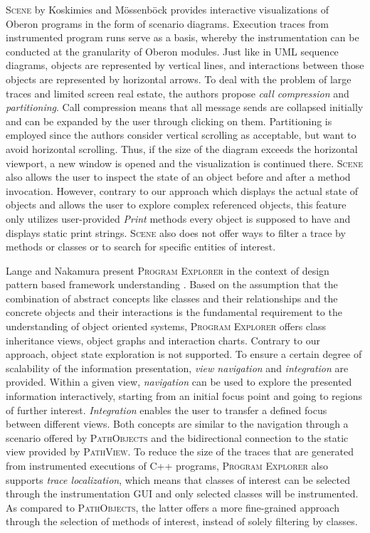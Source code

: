 \textsc{Scene} by Koskimies and Mössenböck \cite{koskimies_scene:_1996} provides interactive visualizations of Oberon programs in the form of scenario diagrams.
Execution traces from instrumented program runs serve as a basis, whereby the instrumentation can be conducted at the granularity of Oberon modules.
Just like in UML sequence diagrams, objects are represented by vertical lines, and interactions between those objects are represented by horizontal arrows.
To deal with the problem of large traces and limited screen  real estate, the authors propose \emph{call compression} and \emph{partitioning}.
Call compression means that all message sends are collapsed initially and can be expanded by the user through clicking on them.
Partitioning is employed since the authors consider vertical scrolling as acceptable, but want to avoid horizontal scrolling. Thus, if the size of the diagram exceeds the horizontal viewport, a new window is opened and the visualization is continued there.
\textsc{Scene} also allows the user to inspect the state of an object before and after a method invocation.
However, contrary to our approach which displays the actual state of objects and allows the user to explore complex referenced objects, this feature only utilizes user-provided \emph{Print} methods every object is supposed to have and displays static print strings.
\textsc{Scene} also does not offer ways to filter a trace by methods or classes or to search for specific entities of interest.

Lange and Nakamura present \textsc{Program Explorer} in the context of design pattern based framework understanding \cite{lange_interactive_1995, lange_program_1995, lange_object-oriented_1997}.
Based on the assumption that the combination of abstract concepts like classes and their relationships and the concrete objects and their interactions is the fundamental requirement to the understanding of object oriented systems, \textsc{Program Explorer} offers class inheritance views, object graphs and interaction charts.
Contrary to our approach, object state exploration is not supported.
To ensure a certain degree of scalability of the information presentation, \emph{view navigation} and \emph{integration} are provided.
Within a given view, \emph{navigation} can be used to explore the presented information interactively, starting from an initial focus point and going to regions of further interest.
\emph{Integration} enables the user to transfer a defined focus between different views.
Both concepts are similar to the navigation through a scenario offered by \textsc{PathObjects} and the bidirectional connection to the static view provided by \textsc{PathView}.
To reduce the size of the traces that are generated from instrumented executions of C++ programs, \textsc{Program Explorer} also supports \emph{trace localization}, which means that classes of interest can be selected through the instrumentation GUI and only selected classes will be instrumented.
As compared to \textsc{PathObjects}, the latter offers a more fine-grained approach through the selection of methods of interest, instead of solely filtering by classes.

